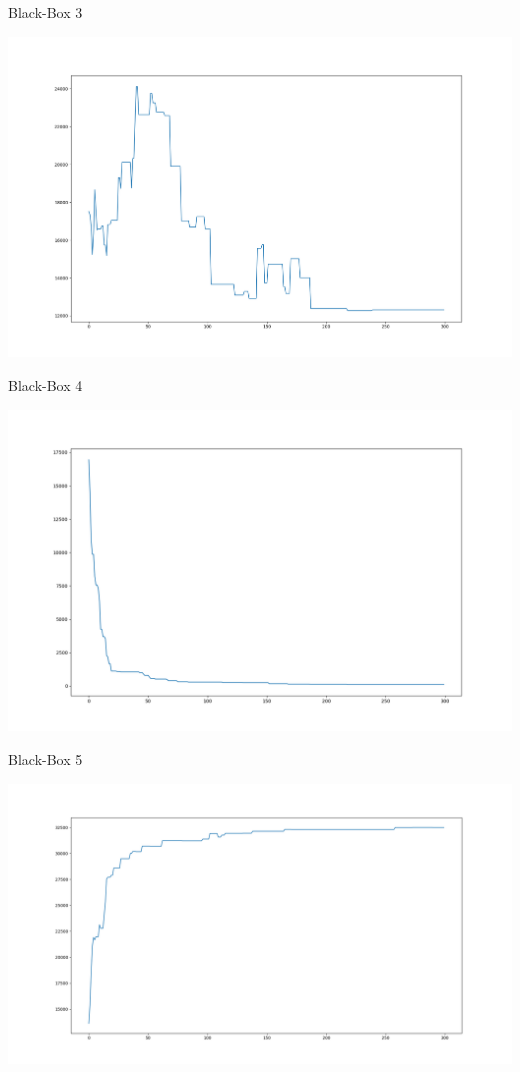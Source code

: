 \documentclass{ocbeameruni}
\begin{document}
\begin{frame}{Black-Box 3}
    \begin{center}
    \includegraphics[scale=0.16]{plots/bb3.png}
    \end{center}
\end{frame}

\begin{frame}{Black-Box 4}
    \begin{center}
    \includegraphics[scale=0.16]{plots/bb4.png}
    \end{center}
\end{frame}

\begin{frame}{Black-Box 5}
    \begin{center}
    \includegraphics[scale=0.16]{plots/bb5.png}
    \end{center}
\end{frame}
\end{document}
